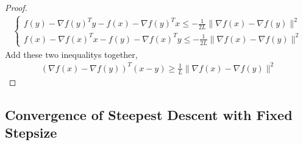 \documentclass[11pt,a4paper]{article}
\begin{document}
\begin{proof}
\begin{equation}
    \begin{aligned}
        \left\{\begin{matrix}
            f(y)-\nabla f(y)^Ty-f(x)-\nabla f(y)^Tx\leq -\frac{1}{2L}\|\nabla f(x)-\nabla f(y)\|^2\\
            f(x)-\nabla f(x)^Tx-f(y)-\nabla f(x)^Ty\leq -\frac{1}{2L}\|\nabla f(x)-\nabla f(y)\|^2
        \end{matrix}\right.
    \end{aligned}
    \nonumber
\end{equation}
Add these two inequalitys together,
\begin{equation}
    \begin{aligned}
        (\nabla f(x)-\nabla f(y))^T(x-y)\geq \frac{1}{L}\|\nabla f(x)-\nabla f(y)\|^2
    \end{aligned}
    \nonumber
\end{equation}
\end{proof}

\subsection{Convergence of Steepest Descent with Fixed Stepsize}
\end{document}
